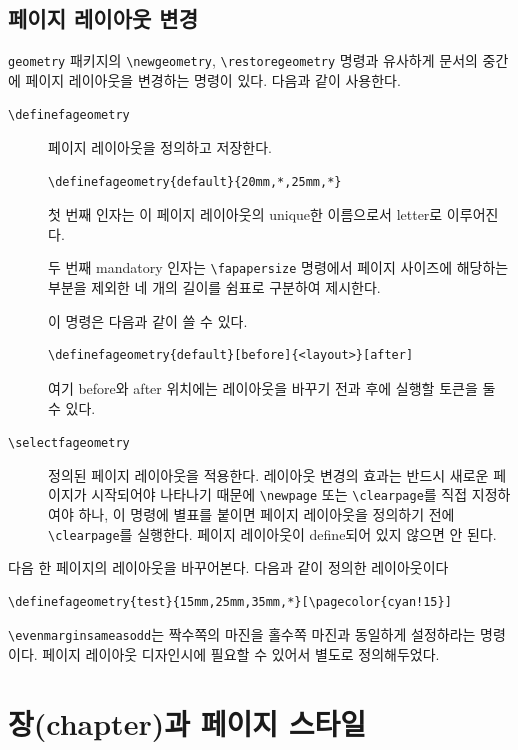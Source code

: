 \documentclass[
	12pt,
	a4paper,
	kosection,
	footnote,
	microtype,
	figtabcapt,
]{oblivoir}
\def\cs#1{\texttt{\textbackslash #1}}
\begin{document}
\subsection{페이지 레이아웃 변경}

\texttt{geometry} 패키지의 \cs{newgeometry}, \cs{restoregeometry} 명령과 유사하게
문서의 중간에 페이지 레이아웃을 변경하는 명령이 있다. 다음과 같이 사용한다.

\begin{description}
\item [\cs{definefageometry}] 페이지 레이아웃을 정의하고 저장한다.
\begin{verbatim}
\definefageometry{default}{20mm,*,25mm,*}
\end{verbatim}
첫 번째 인자는 이 페이지 레이아웃의 unique한 이름으로서 letter로 이루어진다.

두 번째 mandatory 인자는 \verb|\fapapersize| 명령에서
페이지 사이즈에 해당하는 부분을 제외한 네 개의 길이를 쉼표로 구분하여 제시한다.

이 명령은 다음과 같이 쓸 수 있다.
\begin{verbatim}
\definefageometry{default}[before]{<layout>}[after]
\end{verbatim}
여기 before와 after 위치에는 레이아웃을 바꾸기 전과 후에 실행할
토큰을 둘 수 있다.

\item[\cs{selectfageometry}] 정의된 페이지 레이아웃을 적용한다. 
레이아웃 변경의 효과는 반드시 새로운 페이지가 시작되어야 나타나기 때문에
\cs{newpage} 또는 \cs{clearpage}를 직접 지정하여야 하나,
이 명령에 별표를 붙이면 페이지 레이아웃을 정의하기 전에 \cs{clearpage}를 
실행한다. 
페이지 레이아웃이 define되어 있지 않으면 안 된다.

\end{description}

다음 한 페이지의 레이아웃을 바꾸어본다. 다음과 같이 정의한 레이아웃이다
\begin{verbatim}
\definefageometry{test}{15mm,25mm,35mm,*}[\pagecolor{cyan!15}]
\end{verbatim}

\bigskip

\cs{evenmarginsameasodd}는 짝수쪽의 마진을 홀수쪽 마진과
동일하게 설정하라는 명령이다. 페이지 레이아웃 디자인시에 필요할 수
있어서 별도로 정의해두었다.


\section{장(chapter)과 페이지 스타일}
\end{document}

